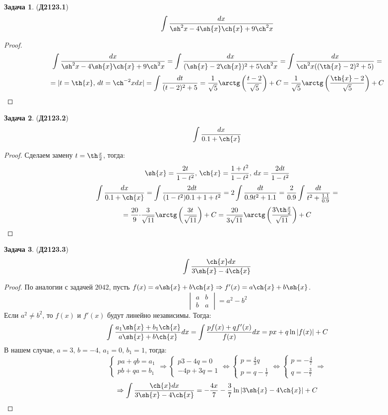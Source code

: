 \documentclass[12pt]{article}
\theoremstyle{definition}
\newtheorem{problem}{Задача}
\DeclareMathOperator{\dint}{\displaystyle\int}
\begin{document}
\begin{problem}(\textbf{Д2123.1})
	$$
		\dint \dfrac{dx}{\sh^2x-4\sh{x}\ch{x} + 9\ch^2{x}}
	$$
\end{problem}
\begin{proof}
	$$
		\dint \dfrac{dx}{\sh^2x-4\sh{x}\ch{x} + 9\ch^2{x}} = \dint \dfrac{dx}{(\sh{x} - 2\ch{x})^2 + 5\ch^2{x}} = \dint \dfrac{dx}{\ch^2{x}((\th{x} - 2)^2 + 5)} =
	$$
	$$
		= |t = \th{x}, \, dt = \ch^{-2}{x}dx| =	\dint \dfrac{dt}{(t - 2)^2 + 5} = \dfrac{1}{\sqrt{5}}\arctg\left(\dfrac{t-2}{\sqrt{5}}\right) + C = \dfrac{1}{\sqrt{5}}\arctg\left(\dfrac{\th{x}-2}{\sqrt{5}}\right) + C 
	$$
\end{proof}
\begin{problem}(\textbf{Д2123.2})
	$$
		\dint \dfrac{dx}{0.1 + \ch{x}}
	$$
\end{problem}
\begin{proof}
	Сделаем замену $t = \th\tfrac{x}{2}$, тогда:
	$$
		\sh{x} = \dfrac{2t}{1-t^2}, \, \ch{x} = \dfrac{1 + t^2}{1 - t^2}, \, dx = \dfrac{2dt}{1- t^2}
	$$
	$$
		\dint \dfrac{dx}{0.1 + \ch{x}} = \dint \dfrac{2dt}{(1-t^2)0.1  + 1 + t^2} = 2\dint \dfrac{dt}{0.9t^2 + 1.1} = \dfrac{2}{0.9}\dint \dfrac{dt}{t^2 + \tfrac{1.1}{0.9}} = 
	$$
	$$
		= \dfrac{20}{9}{\cdot}\dfrac{3}{\sqrt{11}}\arctg\left(\dfrac{3t}{\sqrt{11}}\right) + C = \dfrac{20}{3\sqrt{11}}\arctg\left(\dfrac{3\th\tfrac{x}{2}}{\sqrt{11}}\right) + C
	$$
\end{proof}
\begin{problem}(\textbf{Д2123.3})
	$$
 		\dint \dfrac{\ch{x}dx}{3\sh{x} - 4\ch{x}}
	$$
\end{problem}
\begin{proof}
	По аналогии с задачей $2042$, пусть $f(x) = a\sh{x} + b\ch{x} \Rightarrow f'(x) = a\ch{x} + b\sh{x}$.
	$$
		\begin{vmatrix}
			a & b\\
			b & a
		\end{vmatrix} = a^2 - b^2
	$$
	Если $a^2 \neq b^2$, то $f(x)$ и $f'(x)$ будут линейно независимы. Тогда:
	$$
		\dint \dfrac{a_1\sh{x} + b_1\ch{x}}{a\sh{x} + b\ch{x}}dx = \dint \dfrac{pf(x) + qf'(x)}{f(x)}dx = px + q\ln|f(x)| + C
	$$
	В нашем случае, $a = 3, \, b = -4, \, a_1 = 0, \, b_1 = 1$, тогда:
	$$
		\begin{cases}
			pa + qb = a_1\\
			pb + qa = b_1
		\end{cases} \Rightarrow
		\begin{cases}
			p3 -4q = 0\\
			-4p + 3q = 1
		\end{cases} \Leftrightarrow
		\begin{cases}
			p = \tfrac{4}{3}q\\
			p = q - \tfrac{1}{7}
		\end{cases} \Leftrightarrow
		\begin{cases}
			p = -\tfrac{4}{7}\\
			q = -\tfrac{3}{7}
		\end{cases} \Rightarrow 
	$$
	$$
		\Rightarrow \dint \dfrac{\ch{x}dx}{3\sh{x} - 4\ch{x}} = -\dfrac{4x}{7} - \dfrac{3}{7}\ln|3\sh{x} - 4\ch{x}| + C
	$$
\end{proof}
\end{document}
